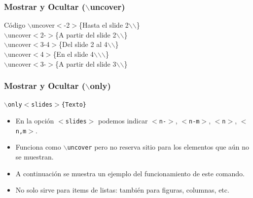\documentclass[aspectratio=1610]{beamer}%
\begin{document}
\begin{frame}[fragile]
\frametitle{\textbf{Mostrar y Ocultar ($\backslash$uncover)}}
\justifying
 
 
\begin{exampleblock}{Código}
$\backslash$uncover$<$-2$>$\{Hasta el slide 2$\backslash$$\backslash$\}\\
$\backslash$uncover$<$2-$>$\{A partir del slide 2$\backslash$$\backslash$\}\\
$\backslash$uncover$<$3-4$>$\{Del slide 2 al 4$\backslash$$\backslash$\}\\
$\backslash$uncover$<$4$>$\{En el slide 4$\backslash$$\backslash$$\backslash$\} \\
$\backslash$uncover$<$3-$>$\{A partir del slide 3$\backslash$$\backslash$\}
\end{exampleblock}

 
\end{frame}

\begin{frame}[fragile]
\frametitle{\textbf{Mostrar y Ocultar ($\backslash$only)}}
\justifying
  \texttt{$\backslash$only$<$slides$>$\{Texto\}}
 \begin{itemize}\justifying
  \item En la opción \texttt{$<$slides$>$} podemos indicar \texttt{$<$n-$>$}, \texttt{$<$n-m$>$}, \texttt{$<$n$>$}, \texttt{$<$n,m$>$}.
  \item Funciona como \texttt{$\backslash$uncover} pero no reserva sitio para los elementos que aún no se muestran.
  \item A continuación se muestra un ejemplo del funcionamiento de este comando.
  \item No solo sirve para items de listas: también para figuras, columnas, etc.
\end{itemize}

\end{frame}
\end{document}
